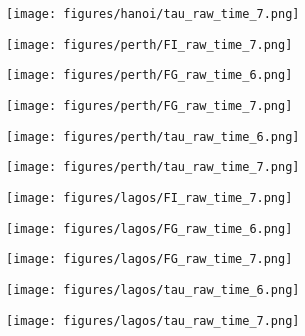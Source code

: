 \documentclass[a4paper]{article}
\def\lthtmlcheckvsize{\ifdim\ht\sizebox<\vsize 
  \ifdim\wd\sizebox<\hsize\expandafter\hfill\fi \expandafter\vfill
  \else\expandafter\vss\fi}%
\begin{document}
{\newpage\clearpage
{}%
\texttt{[image: figures/hanoi/tau\_raw\_time\_7.png]}%
\lthtmlpictureZ
\lthtmlcheckvsize\clearpage}

{\newpage\clearpage
{}%
\texttt{[image: figures/perth/FI\_raw\_time\_7.png]}%
\lthtmlpictureZ
\lthtmlcheckvsize\clearpage}

{\newpage\clearpage
{}%
\texttt{[image: figures/perth/FG\_raw\_time\_6.png]}%
\lthtmlpictureZ
\lthtmlcheckvsize\clearpage}

{\newpage\clearpage
{}%
\texttt{[image: figures/perth/FG\_raw\_time\_7.png]}%
\lthtmlpictureZ
\lthtmlcheckvsize\clearpage}

{\newpage\clearpage
{}%
\texttt{[image: figures/perth/tau\_raw\_time\_6.png]}%
\lthtmlpictureZ
\lthtmlcheckvsize\clearpage}

{\newpage\clearpage
{}%
\texttt{[image: figures/perth/tau\_raw\_time\_7.png]}%
\lthtmlpictureZ
\lthtmlcheckvsize\clearpage}

{\newpage\clearpage
{}%
\texttt{[image: figures/lagos/FI\_raw\_time\_7.png]}%
\lthtmlpictureZ
\lthtmlcheckvsize\clearpage}

{\newpage\clearpage
{}%
\texttt{[image: figures/lagos/FG\_raw\_time\_6.png]}%
\lthtmlpictureZ
\lthtmlcheckvsize\clearpage}

{\newpage\clearpage
{}%
\texttt{[image: figures/lagos/FG\_raw\_time\_7.png]}%
\lthtmlpictureZ
\lthtmlcheckvsize\clearpage}

{\newpage\clearpage
{}%
\texttt{[image: figures/lagos/tau\_raw\_time\_6.png]}%
\lthtmlpictureZ
\lthtmlcheckvsize\clearpage}

{\newpage\clearpage
{}%
\texttt{[image: figures/lagos/tau\_raw\_time\_7.png]}%
\lthtmlpictureZ
\lthtmlcheckvsize\clearpage}
\end{document}

